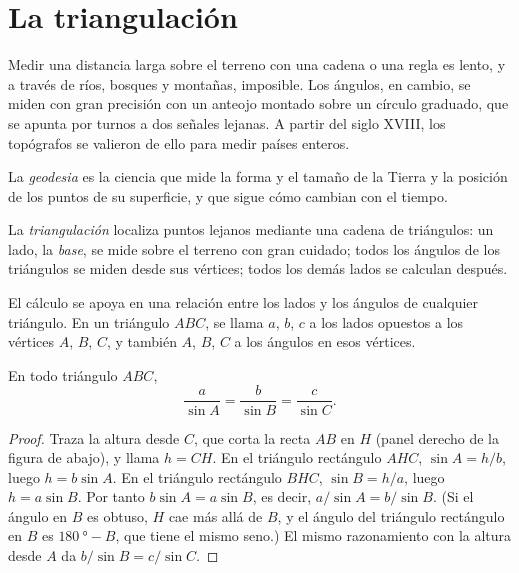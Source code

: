 \section{La triangulación}

Medir una distancia larga sobre el terreno con una cadena o una regla es
lento, y a través de ríos, bosques y montañas, imposible. Los ángulos, en
cambio, se miden con gran precisión con un anteojo montado sobre un círculo
graduado, que se apunta por turnos a dos señales lejanas. A partir del
siglo XVIII, los topógrafos se valieron de ello para medir países enteros.

\begin{definition}[Geodesia]\label{def:g10:measuring-the-earth:geodesy}
La \emph{geodesia} es la ciencia que mide la forma y el
tamaño de la Tierra y la posición de los puntos de su superficie, y que
sigue cómo cambian con el tiempo.
\end{definition}

\begin{definition}[Triangulación]\label{def:g10:measuring-the-earth:triangulation}
La \emph{triangulación} localiza puntos
lejanos mediante una cadena de triángulos: un lado, la \emph{base}, se mide
sobre el terreno con gran cuidado; todos los ángulos de los triángulos se
miden desde sus vértices; todos los demás lados se calculan después.
\end{definition}

El cálculo se apoya en una relación entre los lados y los ángulos de
cualquier triángulo. En un triángulo $ABC$, se llama $a$, $b$, $c$ a los
lados opuestos a los vértices $A$, $B$, $C$, y también $A$, $B$, $C$ a los
ángulos en esos vértices.

\begin{proposition}\label{prop:g10:measuring-the-earth:sine-rule}
En todo triángulo $ABC$,
\[
  \frac{a}{\sin A} = \frac{b}{\sin B} = \frac{c}{\sin C}.
\]
\end{proposition}

\begin{proof}
Traza la altura desde $C$, que corta la recta $AB$ en $H$ (panel derecho de
la figura de abajo), y llama $h = CH$. En el triángulo rectángulo $AHC$,
$\sin A = h/b$, luego $h = b \sin A$. En el triángulo rectángulo $BHC$,
$\sin B = h/a$, luego $h = a \sin B$. Por tanto $b \sin A = a \sin B$, es
decir, $a/\sin A = b/\sin B$. (Si el ángulo en $B$ es obtuso, $H$ cae más
allá de $B$, y el ángulo del triángulo rectángulo en $B$ es
$\qty{180}{\degree} - B$, que tiene el mismo seno.) El mismo razonamiento
con la altura desde $A$ da $b/\sin B = c/\sin C$.
\end{proof}

